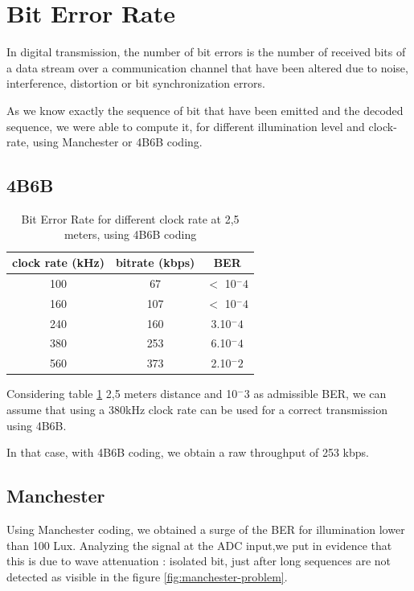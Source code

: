 \section{Bit Error Rate}

In digital transmission, the number of bit errors is the number of received bits of a data stream over a communication channel that have been altered due to noise, interference, distortion or bit synchronization errors.

As we know exactly the sequence of bit that have been emitted and the decoded sequence, we were able to compute it, for different illumination level and clock-rate, using Manchester or 4B6B coding.

\subsection{4B6B}

\begin{table}[htbp]
\begin{center}
\begin{tabular}{|c|c|c|}
  \hline
  clock rate (kHz) & bitrate (kbps) & BER \\
  \hline
  100 & 67 & $<$ 10$^-4$ \\
  160 & 107 & $<$ 10$^-4$ \\
  240 & 160 & 3.10$^-4$ \\
  380 & 253 & 6.10$^-4$ \\
  560 & 373 & 2.10$^-2$ \\
  \hline
\end{tabular}
\end{center}
\caption{Bit Error Rate for different clock rate at 2,5 meters, using 4B6B coding}
\label{tab:ber}
\end{table}

Considering table \ref{tab:ber} 2,5 meters distance and 10$^-3$ as admissible BER, we can assume that using a 380kHz clock rate can be used for a correct transmission using 4B6B.

In that case, with 4B6B coding, we obtain a raw throughput of 253 kbps.

\subsection{Manchester}
Using Manchester coding, we obtained a surge of the BER for illumination lower than 100 Lux. Analyzing the signal at the ADC input,we put in evidence that this is due to wave attenuation : isolated bit, just after long sequences are not detected as visible in the figure \ref{fig:manchester-problem}.

